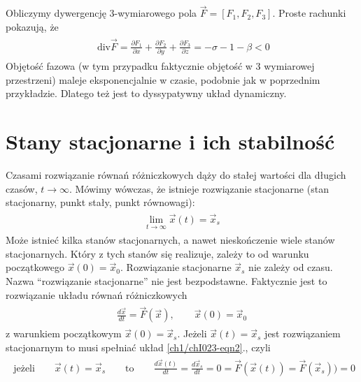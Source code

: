 \documentclass[a4paper,12pt,polish]{sphinxmanual}
\begin{document}
Obliczymy  dywergencję 3-wymiarowego pola $\vec F = [F_1, F_2, F_3]$. Proste rachunki pokazują, że
\label{ch1/chI022:equation-eqn43}\begin{gather}
\begin{split}\mbox{ div} \vec F =  \frac{\partial F_1}{\partial x} + \frac{\partial F_2}{\partial y}   + \frac{\partial F_3}{\partial z}  = -\sigma -1 - \beta <0\end{split}\label{ch1/chI022-eqn43}
\end{gather}
Objętość fazowa (w tym przypadku faktycznie objętość w 3 wymiarowej przestrzeni) maleje  eksponencjalnie w czasie, podobnie jak w poprzednim przykładzie.  Dlatego też jest to dyssypatywny układ dynamiczny.


\section{Stany stacjonarne i ich stabilność}
\label{ch1/chI023:stany-stacjonarne-i-ich-stabilnosc}\label{ch1/chI023::doc}
Czasami rozwiązanie równań różniczkowych dąży do stałej wartości dla długich czasów, $t\to \infty$. Mówimy wówczas, że istnieje rozwiązanie stacjonarne (stan stacjonarny, punkt stały, punkt równowagi):
\label{ch1/chI023:equation-eqn1}\begin{gather}
\begin{split}\lim_{t \to \infty}  \vec x(t) = \vec x_s\end{split}\label{ch1/chI023-eqn1}
\end{gather}
Może istnieć kilka stanów stacjonarnych, a nawet nieskończenie wiele stanów stacjonarnych. Który z tych stanów się realizuje,  zależy to od warunku początkowego $\vec x(0) = \vec x_0$. Rozwiązanie stacjonarne $\vec x_s$ nie zależy od czasu. Nazwa ``rozwiązanie stacjonarne'' nie jest bezpodstawne. Faktycznie jest to rozwiązanie układu równań  różniczkowych
\label{ch1/chI023:equation-eqn2}\begin{gather}
\begin{split}\frac{d\vec x}{dt} = \vec F(\vec x), \qquad \vec x(0)  = \vec x_0\end{split}\label{ch1/chI023-eqn2}
\end{gather}
z warunkiem początkowym $\vec x(0) = \vec x_s$. Jeżeli  $\vec x(t) = \vec x_s$ jest rozwiązaniem stacjonarnym to musi spełniać układ \eqref{ch1/chI023-eqn2}., czyli
\label{ch1/chI023:equation-eqn3}\begin{gather}
\begin{split}\mbox{jeżeli} \qquad \vec x(t) = \vec x_s \qquad \mbox{to} \qquad \frac{d\vec x(t)}{dt} = \frac{d\vec x_s}{dt}=0 = \vec F(\vec x(t)) = \vec F(\vec x_s)) = 0\end{split}\label{ch1/chI023-eqn3}
\end{gather}
\end{document}
